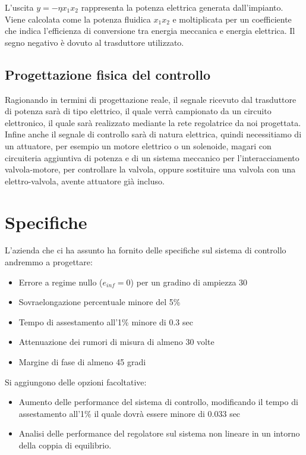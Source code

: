 \documentclass{article}
\begin{document}
L'uscita $y=-\eta x_1 x_2$ rappresenta la potenza elettrica generata dall'impianto. Viene calcolata come la potenza fluidica $x_1 x_2$ e moltiplicata per un coefficiente che indica l'efficienza di conversione tra energia meccanica e energia elettrica. Il segno negativo è dovuto al trasduttore utilizzato.

\subsection{Progettazione fisica del controllo}

Ragionando in termini di progettazione reale, il segnale ricevuto dal trasduttore di potenza sarà di tipo elettrico, il quale verrà campionato da un circuito elettronico, il quale sarà realizzato mediante la rete regolatrice da noi progettata. 
Infine anche il segnale di controllo sarà di natura elettrica, quindi necessitiamo di un attuatore, per esempio un motore elettrico o un solenoide, magari con circuiteria aggiuntiva di potenza e di un sistema meccanico per l'interacciamento valvola-motore, per controllare la valvola, oppure sostituire una valvola con una elettro-valvola, avente attuatore già incluso.

\section{Specifiche}

L'azienda che ci ha assunto ha fornito delle specifiche sul sistema di controllo andremmo a progettare:

\begin{itemize}
    \item Errore a regime nullo ($e_{inf}=0$) per un gradino di ampiezza 30
    \item Sovraelongazione percentuale minore del 5\%
    \item Tempo di assestamento all'1\% minore di 0.3 sec
    \item Attenuazione dei rumori di misura di almeno 30 volte
    \item Margine di fase di almeno 45 gradi
\end{itemize}

Si aggiungono delle opzioni facoltative:
\begin{itemize}
    \item Aumento delle performance del sistema di controllo, modificando il tempo di assestamento all'1\% il quale dovrà essere minore di 0.033 sec
    \item Analisi delle performance del regolatore sul sistema non lineare in un intorno della coppia di equilibrio.
\end{itemize}
\end{document}
